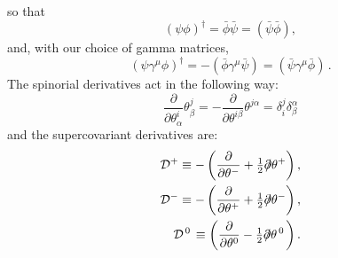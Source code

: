 \documentclass[a4paper,12pt]{article}
\newcommand{\ft}[2]{{\textstyle\frac{#1}{#2}}}
\begin{document}
so that
\begin{equation}
(\psi\phi)^\dagger=\bar\phi\bar\psi=(\bar\psi\bar\phi),
\end{equation}
and, with our choice of gamma matrices,
\begin{equation}
(\psi\gamma^\mu\phi)^\dagger=-(\bar\phi\gamma^\mu\bar\psi)=
(\bar\psi\gamma^\mu\bar\phi)\,.
\end{equation}
The spinorial derivatives act in the following way:
\begin{equation}
\frac{\partial}{\partial\theta^i_\alpha}\theta^j_\beta=
-\frac{\partial}{\partial\theta^{i\beta}}\theta^{j\alpha}=
\delta_i^j\delta^\alpha_\beta
\end{equation}
and the supercovariant derivatives are:
\begin{eqnarray}
{\cal D}^+\equiv-\left(\frac{\partial}{\partial\theta^-}
+\ft{1}{2}\partial\!\!\!/\theta^+\right),\nonumber\\
{\cal D}^-\equiv-\left(\frac{\partial}{\partial\theta^+}
+\ft{1}{2}\partial\!\!\!/\theta^-\right),\nonumber\\
{\cal D}^{\,0\,}\equiv\left(\frac{\partial}{\partial\theta^0}
-\ft{1}{2}\partial\!\!\!/\theta^{\,0\,}\right).
\end{eqnarray}
\end{document}
